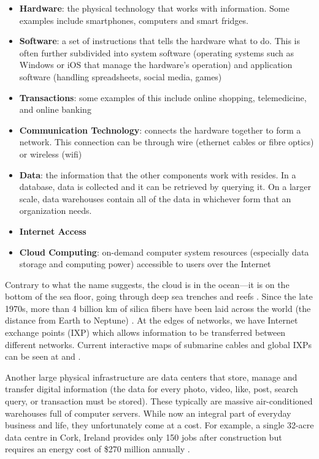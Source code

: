 \documentclass{article}
\begin{document}
\begin{itemize}
    \item \textbf{Hardware}: the physical technology that works with information. Some examples include smartphones, computers and smart fridges.
    \item \textbf{Software}: a set of instructions that tells the hardware what to do. This is often further subdivided into system software (operating systems such as Windows or iOS that manage the hardware's operation) and application software (handling spreadsheets, social media, games)
    \item \textbf{Transactions}: some examples of this include online shopping, telemedicine, and online banking
    \item \textbf{Communication Technology}: connects the hardware together to form a network. This connection can be through wire (ethernet cables or fibre optics) or wireless (wifi)
    \item \textbf{Data}: the information that the other components work with resides. In a database, data is collected and it can be retrieved by querying it. On a larger scale, data warehouses contain all of the data in whichever form that an organization needs.
    \item \textbf{Internet Access}
    \item \textbf{Cloud Computing}: on-demand computer system resources (especially data storage and computing power) accessible to users over the Internet \cite{hayes2008cloud}
\end{itemize}

Contrary to what the name suggests, the cloud is in the ocean---it is on the bottom of the sea floor, going through deep sea trenches and reefs \cite{starosielski2012warning, blum2012tubes}. Since the late 1970s, more than 4 billion km of silica fibers have been laid across the world (the distance from Earth to Neptune) \cite{doi:10.1021/cen-09810-cover}. At the edges of networks, we have Internet exchange points (IXP) which allows information to be transferred between different networks. Current interactive maps of submarine cables and  global IXPs can be seen at \cite{mapsubmarinecables2021} and \cite{mapIXP2021}.

Another large physical infrastructure are data centers that store, manage and transfer digital information (the data for every photo, video, like, post, search query, or transaction must be stored). These typically are massive air-conditioned warehouses full of computer servers. While now an integral part of everyday business and life, they unfortunately come at a cost. For example, a single 32-acre data centre in Cork, Ireland provides only 150 jobs after construction but requires an energy cost of \$270 million annually \cite{irishtimes2016datacentre}. 
\end{document}
